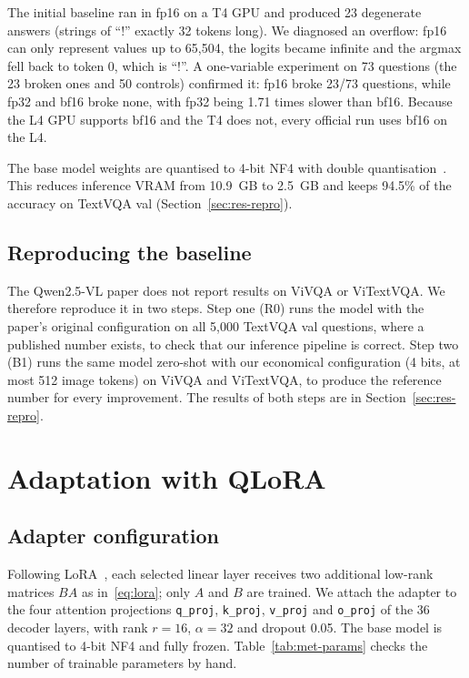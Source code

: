 The initial baseline ran in fp16 on a T4 GPU and produced 23 degenerate answers (strings
of ``!'' exactly 32 tokens long). We diagnosed an overflow: fp16 can only represent
values up to 65,504, the logits became infinite and the argmax fell back to token 0,
which is ``!''. A one-variable experiment on 73 questions (the 23 broken ones and 50
controls) confirmed it: fp16 broke 23/73 questions, while fp32 and bf16 broke none, with
fp32 being 1.71 times slower than bf16. Because the L4 GPU supports bf16 and the T4 does
not, every official run uses bf16 on the L4.

The base model weights are quantised to 4-bit NF4 with double
quantisation~\cite{dettmers2023qlora}. This reduces inference VRAM from 10.9~GB to
2.5~GB and keeps 94.5\% of the accuracy on TextVQA val (Section~\ref{sec:res-repro}).

\subsection{Reproducing the baseline}

The Qwen2.5-VL paper does not report results on ViVQA or ViTextVQA. We therefore
reproduce it in two steps. Step one (R0) runs the model with the paper's original
configuration on all 5,000 TextVQA val questions, where a published number exists, to
check that our inference pipeline is correct. Step two (B1) runs the same model
zero-shot with our economical configuration (4 bits, at most 512 image tokens) on
ViVQA and ViTextVQA, to produce the reference number for every improvement. The results
of both steps are in Section~\ref{sec:res-repro}.

\section{Adaptation with QLoRA}
\label{sec:met-qlora}

\subsection{Adapter configuration}

Following LoRA~\cite{hu2022lora}, each selected linear layer
receives two additional low-rank matrices $BA$ as in~\eqref{eq:lora}; only $A$ and $B$ are trained. We
attach the adapter to the four attention projections \texttt{q\_proj},
\texttt{k\_proj}, \texttt{v\_proj} and \texttt{o\_proj} of the 36 decoder layers, with
rank $r = 16$, $\alpha = 32$ and dropout 0.05. The base model is quantised to 4-bit NF4
and fully frozen. Table~\ref{tab:met-params} checks the number of trainable parameters
by hand.

